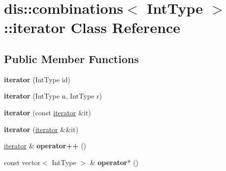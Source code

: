 \hypertarget{classdis_1_1combinations_1_1iterator}{\section{dis\-:\-:combinations$<$ Int\-Type $>$\-:\-:iterator Class Reference}
\label{classdis_1_1combinations_1_1iterator}
}
\subsection*{Public Member Functions}
\begin{DoxyCompactItemize}
\item 
\hypertarget{classdis_1_1combinations_1_1iterator_a08fddfc05d8871b0c1442248085e60d9}{{\bfseries iterator} (Int\-Type id)}\label{classdis_1_1combinations_1_1iterator_a08fddfc05d8871b0c1442248085e60d9}

\item 
\hypertarget{classdis_1_1combinations_1_1iterator_aed02fc501768d4f3c5b2eeccdcd1927c}{{\bfseries iterator} (Int\-Type n, Int\-Type r)}\label{classdis_1_1combinations_1_1iterator_aed02fc501768d4f3c5b2eeccdcd1927c}

\item 
\hypertarget{classdis_1_1combinations_1_1iterator_a11d2cb2608039195e89d16a7686b47a5}{{\bfseries iterator} (const \hyperlink{classdis_1_1combinations_1_1iterator}{iterator} \&it)}\label{classdis_1_1combinations_1_1iterator_a11d2cb2608039195e89d16a7686b47a5}

\item 
\hypertarget{classdis_1_1combinations_1_1iterator_a17f9d3d270db7e762ad757137ecd3cef}{{\bfseries iterator} (\hyperlink{classdis_1_1combinations_1_1iterator}{iterator} \&\&it)}\label{classdis_1_1combinations_1_1iterator_a17f9d3d270db7e762ad757137ecd3cef}

\item 
\hypertarget{classdis_1_1combinations_1_1iterator_a46f238c7422fefd6e4fccf1e18fe1362}{\hyperlink{classdis_1_1combinations_1_1iterator}{iterator} \& {\bfseries operator++} ()}\label{classdis_1_1combinations_1_1iterator_a46f238c7422fefd6e4fccf1e18fe1362}

\item 
\hypertarget{classdis_1_1combinations_1_1iterator_a78bdd328e8ac0aa614afe1da90acfcf3}{const vector$<$ Int\-Type $>$ \& {\bfseries operator$\ast$} ()}\label{classdis_1_1combinations_1_1iterator_a78bdd328e8ac0aa614afe1da90acfcf3}


\end{DoxyCompactItemize}

